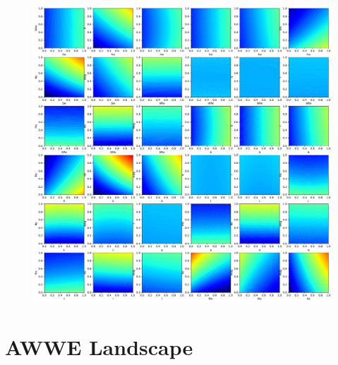 \documentclass[
  letterpaper,
  DIV=11,
  numbers=noendperiod]{scrreprt}
\begin{document}
\begin{figure}[H]

{\centering \includegraphics{002_awwe_files/figure-pdf/cell-14-output-1.pdf}

}

\end{figure}

\hypertarget{awwe-landscape}{%
\section{AWWE Landscape}\label{awwe-landscape}}
\end{document}
